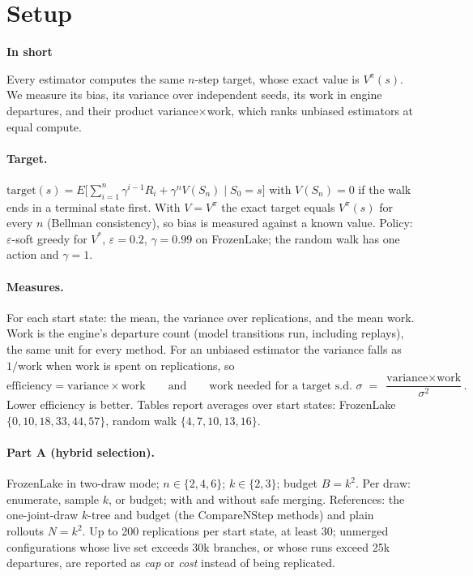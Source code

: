 \documentclass[11pt]{article}
\newcommand{\shadedbox}[3]{\par\smallskip\noindent\colorbox{#1}{\parbox{\dimexpr\linewidth-2\fboxsep}{\textbf{#2}\par #3}}\par\smallskip}
\newcommand{\takeaway}[1]{\shadedbox{okbg}{In short}{#1}}
\begin{document}
\section{Setup}\label{sec:setup}

\takeaway{Every estimator computes the same $n$-step target, whose exact value is $V^\pi(s)$. We measure its bias,
its variance over independent seeds, its work in engine departures, and their product variance$\times$work, which
ranks unbiased estimators at equal compute.}

\paragraph{Target.} $\mathrm{target}(s)=E\big[\sum_{i=1}^{n}\gamma^{i-1}R_i+\gamma^nV(S_n)\mid S_0=s\big]$ with
$V(S_n)=0$ if the walk ends in a terminal state first. With $V=V^\pi$ the exact target equals $V^\pi(s)$ for every $n$
(Bellman consistency), so bias is measured against a known value. Policy: $\varepsilon$-soft greedy for $V^*$,
$\varepsilon=0.2$, $\gamma=0.99$ on FrozenLake; the random walk has one action and $\gamma=1$.

\paragraph{Measures.} For each start state: the mean, the variance over replications, and the mean work. Work is the
engine's departure count (model transitions run, including replays), the same unit for every method. For an unbiased
estimator the variance falls as $1/\text{work}$ when work is spent on replications, so
\[
\text{efficiency} = \text{variance}\times\text{work}
\qquad\text{and}\qquad
\text{work needed for a target s.d. }\sigma \;=\; \frac{\text{variance}\times\text{work}}{\sigma^2}.
\]
Lower efficiency is better. Tables report averages over start states: FrozenLake $\{0,10,18,33,44,57\}$, random walk
$\{4,7,10,13,16\}$.

\paragraph{Part A (hybrid selection).} FrozenLake in two-draw mode; $n\in\{2,4,6\}$; $k\in\{2,3\}$; budget $B=k^2$.
Per draw: enumerate, sample $k$, or budget; with and without safe merging. References: the one-joint-draw $k$-tree and
budget (the Compare\-NStep methods) and plain rollouts $N=k^2$. Up to 200 replications per start state, at least 30;
unmerged configurations whose live set exceeds 30k branches, or whose runs exceed 25k departures, are reported as
\emph{cap} or \emph{cost} instead of being replicated.
\end{document}
